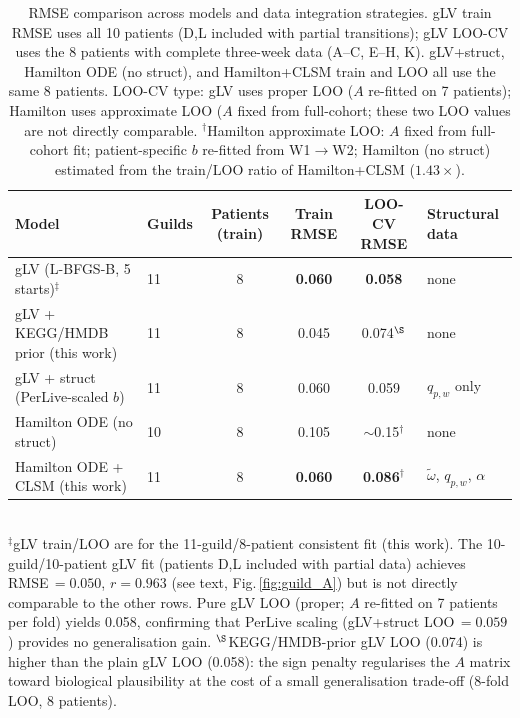 \documentclass[11pt,a4paper]{article}
\begin{document}
\begin{table}[htbp]
\centering\small
\caption{RMSE comparison across models and data integration strategies.
gLV train RMSE uses all 10 patients (D,L included with partial transitions); gLV LOO-CV uses the 8 patients with complete three-week data (A--C, E--H, K).
gLV+struct, Hamilton ODE (no struct), and Hamilton+CLSM train and LOO all use the same 8 patients.
LOO-CV type: gLV uses proper LOO ($A$ re-fitted on 7 patients); Hamilton uses approximate LOO ($A$ fixed from full-cohort; these two LOO values are not directly comparable.
$^\dagger$Hamilton approximate LOO: $A$ fixed from full-cohort fit; patient-specific $b$ re-fitted from W1$\to$W2; Hamilton (no struct) estimated from the train/LOO ratio of Hamilton+CLSM ($1.43\times$).}
\label{tab:rmse_guild}
\begin{tabular}{@{}llcccl@{}}
\toprule
\textbf{Model} & \textbf{Guilds} & \textbf{Patients (train)} & \textbf{Train RMSE} & \textbf{LOO-CV RMSE} & \textbf{Structural data}\\
\midrule
gLV (L-BFGS-B, 5 starts)$^{\ddagger}$ & 11 & 8  & \textbf{0.060} & \textbf{0.058} & none\\
gLV + KEGG/HMDB prior (this work)   & 11 & 8  & 0.045 & 0.074$^{\S}$ & none\\
gLV + struct (PerLive-scaled $b$)    & 11 & 8  & 0.060 & 0.059 & $q_{p,w}$ only\\
Hamilton ODE (no struct)             & 10 & 8  & 0.105 & $\sim$0.15$^\dagger$ & none\\
Hamilton ODE + CLSM (this work)      & 11 & 8  & \textbf{0.060} & \textbf{0.086}$^\dagger$ & $\tilde\omega$, $q_{p,w}$, $\alpha$\\
\bottomrule
\end{tabular}
\smallskip\\
\footnotesize $^\ddagger$gLV train/LOO are for the 11-guild/8-patient consistent fit (this work).
The 10-guild/10-patient gLV fit (patients D,L included with partial data) achieves RMSE\,$=0.050$, $r=0.963$ (see text, Fig.\,\ref{fig:guild_A}) but is not directly comparable to the other rows.
Pure gLV LOO (proper; $A$ re-fitted on 7 patients per fold) yields 0.058, confirming that PerLive scaling (gLV+struct LOO\,$=0.059$) provides no generalisation gain.
$^\S$KEGG/HMDB-prior gLV LOO (0.074) is higher than the plain gLV LOO (0.058): the sign penalty regularises the $A$ matrix toward biological plausibility at the cost of a small generalisation trade-off (8-fold LOO, 8 patients).
\end{table}
\end{document}
